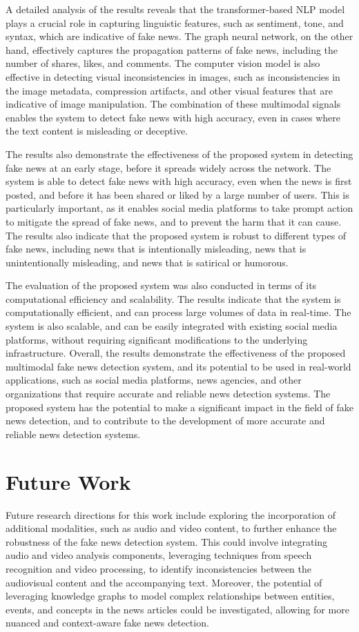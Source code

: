 \documentclass[conference]{IEEEtran}
\begin{document}
A detailed analysis of the results reveals that the transformer-based NLP model plays a crucial role in capturing linguistic features, such as sentiment, tone, and syntax, which are indicative of fake news. The graph neural network, on the other hand, effectively captures the propagation patterns of fake news, including the number of shares, likes, and comments. The computer vision model is also effective in detecting visual inconsistencies in images, such as inconsistencies in the image metadata, compression artifacts, and other visual features that are indicative of image manipulation. The combination of these multimodal signals enables the system to detect fake news with high accuracy, even in cases where the text content is misleading or deceptive.

The results also demonstrate the effectiveness of the proposed system in detecting fake news at an early stage, before it spreads widely across the network. The system is able to detect fake news with high accuracy, even when the news is first posted, and before it has been shared or liked by a large number of users. This is particularly important, as it enables social media platforms to take prompt action to mitigate the spread of fake news, and to prevent the harm that it can cause. The results also indicate that the proposed system is robust to different types of fake news, including news that is intentionally misleading, news that is unintentionally misleading, and news that is satirical or humorous.

The evaluation of the proposed system was also conducted in terms of its computational efficiency and scalability. The results indicate that the system is computationally efficient, and can process large volumes of data in real-time. The system is also scalable, and can be easily integrated with existing social media platforms, without requiring significant modifications to the underlying infrastructure. Overall, the results demonstrate the effectiveness of the proposed multimodal fake news detection system, and its potential to be used in real-world applications, such as social media platforms, news agencies, and other organizations that require accurate and reliable news detection systems. The proposed system has the potential to make a significant impact in the field of fake news detection, and to contribute to the development of more accurate and reliable news detection systems.

\section{Future Work}
Future research directions for this work include exploring the incorporation of additional modalities, such as audio and video content, to further enhance the robustness of the fake news detection system. This could involve integrating audio and video analysis components, leveraging techniques from speech recognition and video processing, to identify inconsistencies between the audiovisual content and the accompanying text. Moreover, the potential of leveraging knowledge graphs to model complex relationships between entities, events, and concepts in the news articles could be investigated, allowing for more nuanced and context-aware fake news detection.
\end{document}
